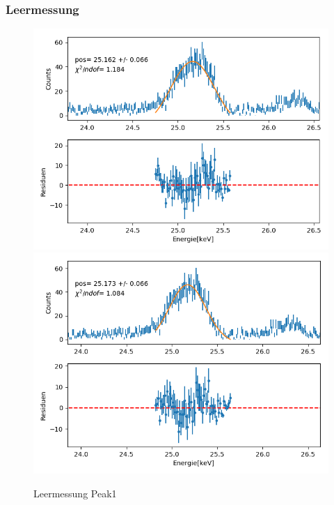 \documentclass[12pt,a4paper]{article}
\begin{document}
\subsubsection{Leermessung}
\begin{figure}[H]
\centering
\includegraphics[scale=0.49]{Bilder/alpha_spektren/leer_1_1.png}
\includegraphics[scale=0.49]{Bilder/alpha_spektren/leer_1_2.png}
\caption{Leermessung Peak1}
\end{figure}
\end{document}
